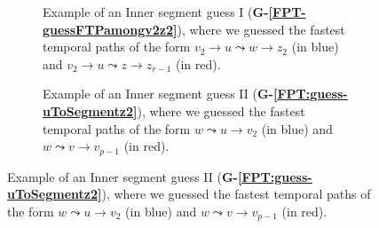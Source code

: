 \documentclass[a4paper,UKenglish,cleveref, autoref, thm-restate]{lipics-v2021}
\begin{document}
\begin{figure}[t]
	\centering
	\begin{subfigure}[b]{0.48\textwidth}
		\centering
		\caption{Example of an Inner segment guess I (\textcolor{lipicsGray}{\textsf{\textbf{G-\ref{FPT-guessFTPamongv2z2}}}}), where we guessed the fastest temporal paths of the form $v_2 \rightarrow u \leadsto w \rightarrow z_2$ (in blue)
			and $v_2 \rightarrow u \leadsto z \rightarrow z_{r-1}$ (in red).
			\label{fig:FPT-guessG4}}
	\end{subfigure}
	\quad
	\begin{subfigure}[b]{0.48\textwidth}
		\centering
		\caption{Example of an Inner segment guess II (\textcolor{lipicsGray}{\textsf{\textbf{G-\ref{FPT:guess-uToSegmentz2}}}}), where we guessed the fastest temporal paths of the form $w \leadsto u \rightarrow v_2$ (in blue) and $w \leadsto v \rightarrow v_{p-1}$ (in red). 
			\label{fig:FPT-guessG5}}
	\end{subfigure}
	

\end{figure}
\end{document}

